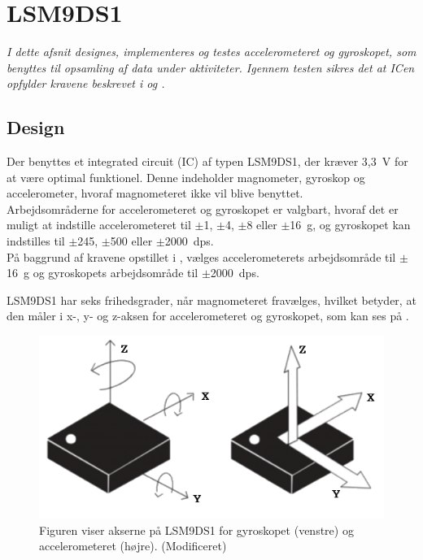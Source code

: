 \section{LSM9DS1}\label{sec_design_LSM9DS1}
\textit{I dette afsnit designes, implementeres og testes accelerometeret og gyroskopet, som benyttes til opsamling af data under aktiviteter. Igennem testen sikres det at ICen opfylder kravene beskrevet i  og .}

\subsection{Design} \label{design_lsm}
Der benyttes et integrated circuit (IC) af typen LSM9DS1, der kræver 3,3~V for at være optimal funktionel. Denne indeholder magnometer, gyroskop og accelerometer, hvoraf magnometeret ikke vil blive benyttet. \\ 
Arbejdsområderne for accelerometeret og gyroskopet er valgbart, hvoraf det er muligt at indstille accelerometeret til $\pm$1, $\pm$4, $\pm$8 eller $\pm$16~g, og gyroskopet kan indstilles til $\pm$245, $\pm$500 eller $\pm$2000~dps. \citep{Jimb02016,STMicroelectronics2016} \\
På baggrund af kravene opstillet i , vælges accelerometerets arbejdsområde til $\pm$16~g og gyroskopets arbejdsområde til $\pm$2000~dps. 

LSM9DS1 har seks frihedsgrader, når magnometeret fravælges, hvilket betyder, at den måler i x-, y- og z-aksen for accelerometeret og gyroskopet, som kan ses på . %
\citep{STMicroelectronics2016}\newline 
\begin{figure}[H]
	\centering
	\includegraphics[scale=0.4]{figures/cDesign/LSM9DS1.png}
	\caption{Figuren viser akserne på LSM9DS1 for gyroskopet (venstre) og accelerometeret (højre). \citep{Jimb02016} (Modificeret)}
	\label{vores_IC}
\end{figure}

